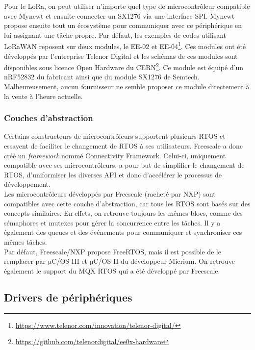 Pour le LoRa, on peut utiliser n'importe quel type de microcontrôleur compatible avec Mynewt et ensuite connecter un SX1276 via une interface SPI. Mynewt propose ensuite tout un écosystème pour communiquer avec ce périphérique en lui assignant une tâche propre.
Par défaut, les exemples de codes utilisant LoRaWAN reposent sur deux modules, le EE-02 et EE-04\footnote{\url{https://www.telenor.com/innovation/telenor-digital/}}. Ces modules ont été développés par l'entreprise Telenor Digital et les schémas de ces modules sont disponibles sous licence Open Hardware du CERN\footnote{\url{https://github.com/telenordigital/ee0x-hardware}}. Ce module est équipé d'un nRF52832 du fabricant ainsi que du module SX1276 de Semtech. Malheureusement, aucun fournisseur ne semble proposer ce module directement à la vente à l'heure actuelle. 

\subsubsection{Couches d'abstraction}
\label{sec-rtos_abstract_layer}

Certains constructeurs de microcontrôleurs supportent plusieurs RTOS et essayent de faciliter le changement de RTOS à ses utilisateurs. Freescale a donc créé un \textit{framework} nommé Connectivity Framework. Celui-ci, uniquement compatible avec ses microcontrôleurs, a pour but de simplifier le changement de RTOS, d'uniformiser les diverses API et donc d'accélérer le processus de développement. \\

Les microcontrôleurs développés par Freescale (racheté par NXP) sont compatibles avec cette couche d'abstraction, car tous les RTOS sont basés sur des concepts similaires. En effets, on retrouve toujours les mêmes blocs, comme des sémaphores et mutexes pour gérer la concurrence entre les tâches. Il y a également des queues et des événements pour communiquer et synchroniser ces mêmes tâches. \\

Par défaut, Freescale/NXP propose FreeRTOS, mais il est possible de le remplacer par µC/OS-III et µC/OS-II du développeur Micrium. On retrouve également le support du MQX RTOS qui a été développé par Freescale.




\subsection{Drivers de périphériques}


